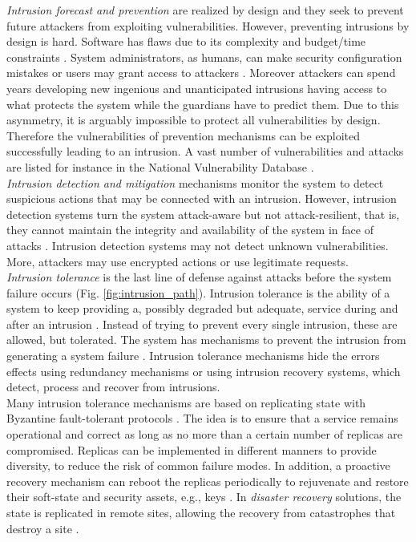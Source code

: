 \emph{Intrusion forecast and prevention} are realized by design and they seek to prevent future attackers from exploiting vulnerabilities. However, preventing intrusions by design is hard. Software has flaws due to its complexity and budget/time constraints \cite{Charette2005,Landwehr1992}. System administrators, as humans, can make security configuration mistakes or users may grant access to attackers \cite{Brown2001}. Moreover attackers can spend years developing new ingenious and unanticipated intrusions having access to what protects the system while the guardians have to predict them. Due to this asymmetry, it is arguably impossible to protect all vulnerabilities by design. Therefore the vulnerabilities of prevention mechanisms can be exploited successfully leading to an intrusion. A vast number of vulnerabilities and attacks are listed for instance in the National Vulnerability Database \cite{nistNVD}.\\

\emph{Intrusion detection and mitigation} mechanisms monitor the system to detect suspicious actions that may be connected with an intrusion. However, intrusion detection systems turn the system attack-aware but not attack-resilient, that is, they cannot maintain the integrity and availability of the system in face of attacks \cite{Ammann2002}. Intrusion detection systems may not detect unknown vulnerabilities. More, attackers may use encrypted actions or use legitimate requests.\\

\emph{Intrusion tolerance} is the last line of defense against attacks before the system failure occurs (Fig. \ref{fig:intrusion_path}). Intrusion tolerance is the ability of a system to keep providing a, possibly degraded but adequate, service during and after an intrusion \cite{Stavridou2001a}. Instead of trying to prevent every single intrusion, these are allowed, but tolerated. The system has mechanisms to prevent the intrusion from generating a system failure \cite{Verissimo2003}. Intrusion tolerance mechanisms hide the errors effects using redundancy mechanisms or using intrusion recovery systems, which detect, process and recover from intrusions.\\

Many intrusion tolerance mechanisms are based on replicating state with Byzantine fault-tolerant protocols \cite{Schneider1990,Castro2002,Veronese2011}. The idea is to ensure that a service remains operational and correct as long as no more than a certain number of replicas are compromised. Replicas can be implemented in different manners to provide diversity, to reduce the risk of common failure modes. In addition, a proactive recovery mechanism can reboot the replicas periodically to rejuvenate and restore their soft-state and security assets, e.g., keys \cite{Candea2001,Castro2002,Sousa2010}. In \emph{disaster recovery} solutions, the state is replicated in remote sites, allowing the recovery from catastrophes that destroy a site \cite{Wood2010}.\\

